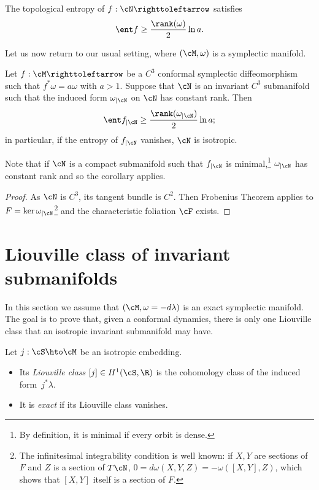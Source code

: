 \begin{corollary}
\label{cor:ent}
The topological entropy of $f : \cN \righttoleftarrow$ satisfies
\[
\ent f \geq \frac{\rank (\omega)}{2} \ln a.
\]
\end{corollary}

Let us now return to our usual setting, where $(\cM,\omega)$ is a symplectic manifold.

\begin{corollary}\label{CCisoento}
Let $f:\cM\righttoleftarrow$ be a $C^3$ conformal symplectic diffeomorphism such that $f^*\omega=a\omega$ with $a>1$. Suppose that $\cN$ is an invariant $C^3$ submanifold such that the induced form $\omega_{\vert \cN}$ on $\cN$ has constant rank. Then
\[
\ent f_{\vert\cN} \geq \frac{\rank (\omega_{\vert \cN})}{2} \ln a;
\]
in particular, if the entropy of $f_{|\cN}$ vanishes, $\cN$ is isotropic.
\end{corollary}

Note that if $\cN$ is a compact submanifold such that $f_{|\cN}$ is minimal,\footnote{By definition, it is minimal if every orbit is dense.} $\omega_{|\cN}$ has constant rank and so the corollary applies.

\begin{proof}
As $\cN$ is $C^3$, its tangent bundle is $C^2$. Then Frobenius Theorem applies to $F = \ker \omega_{\vert \cN}$\footnote{The infinitesimal integrability condition is well known: if $X,Y$ are sections of $F$ and $Z$ is a section of $T\cN$, $0 = d\omega(X,Y,Z) = - \omega([X,Y],Z)$, which shows that $[X,Y]$ itself is a section of $F$.} and the characteristic foliation $\cF$ exists.
\end{proof}

\section{Liouville class of invariant submanifolds}
\label{SLiouville}
\label{sec:exactnessdiff}

In this section we assume that $(\cM,\omega={ -d\lambda})$ is an exact symplectic manifold. The goal is to prove that, given a conformal dynamics, there is only one Liouville class that an isotropic invariant submanifold may have.


\begin{definition}
Let $j : \cS \hto \cM$ be an isotropic embedding.
\begin{itemize}
\item
Its \emph{Liouville class} $[j] \in H^1(\cS,\R)$ is the cohomology class of the induced form~$j^*\lambda$.

\item
It is \emph{exact} if its Liouville class vanishes.
\end{itemize}
\end{definition}

